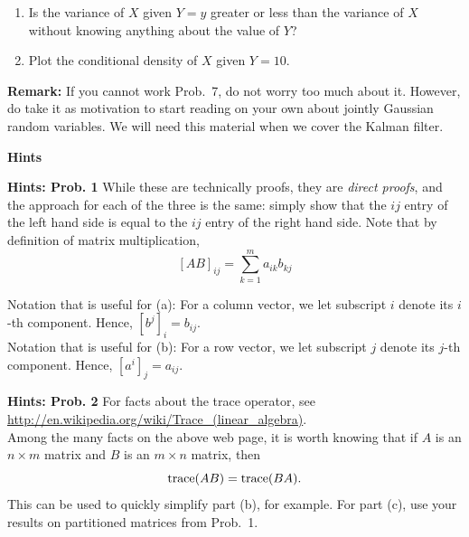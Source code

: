 \documentclass[letterpaper]{article}
\begin{document}
\begin{enumerate}
\begin{enumerate}
\item Is the variance of $X$ given $Y=y$ greater or less than the variance of $X$ without knowing anything about the value of $Y$?

\item Plot the conditional density of $X$ given $Y=10$.
\end{enumerate}

\noindent \textbf{Remark:} If you cannot work Prob.~7, do not worry too much about it. However, do take it as motivation to start reading on your own about jointly Gaussian random variables. We will need this material when we cover the Kalman filter.

\end{enumerate}

\newpage

\begin{center}
{\bf Hints}
\end{center}


\noindent \textbf{Hints: Prob. 1} While these are technically proofs, they are \textit{direct proofs}, and the approach for each of the three is the same: simply show that the $ij$ entry of the left hand side is equal to the $ij$ entry of the right hand side.  Note that by definition of matrix multiplication,
$$ [AB]_{ij} = \sum \limits_{k=1}^{m} a_{ik} b_{kj} $$

Notation that is useful for (a): For a column vector, we let subscript $i$ denote its $i$-th component. Hence, $[b^j]_{i} = b_{ij}$.\\

Notation that is useful for (b): For a row vector, we let subscript $j$ denote its $j$-th component. Hence, $[a^i]_{j} = a_{ij}$.
\vspace{1cm}

\noindent \textbf{Hints: Prob. 2} For facts about the trace operator, see\\
 \url{http://en.wikipedia.org/wiki/Trace_(linear_algebra)}. \\
Among the many facts on the above web page, it is worth knowing that if $A$ is an $n \times m$ matrix and $B$ is an $m \times n$ matrix, then
$$ \mathrm{trace}(AB) = \mathrm{trace}(BA). $$ This can be used to quickly simplify part (b), for example. For part (c), use your results on partitioned matrices from Prob.~1.

\vspace{1cm}
\end{document}

